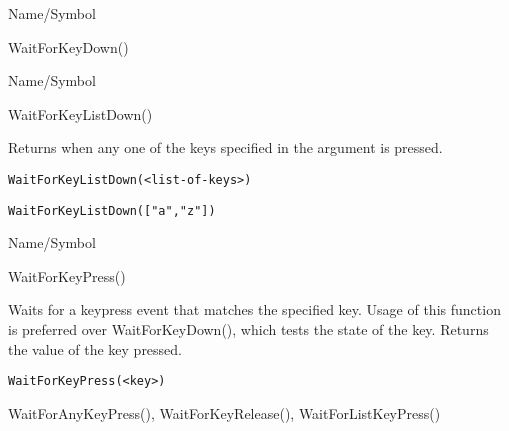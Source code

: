 \rl


\begin{desc}{Name/Symbol}
\item[Name/Symbol]  	WaitForKeyDown()

\item[Description]	

\item[Usage]		

\item[Example]	

\item[See Also]	
\end{desc}

\rl


\begin{desc}{Name/Symbol}
\item[Name/Symbol]  	WaitForKeyListDown()

\item[Description]  	Returns when any one of the keys specified in the argument is 
		pressed.

\item[Usage]
\begin{verbatim}
WaitForKeyListDown(<list-of-keys>)
\end{verbatim}

\item[Example]     	
\begin{verbatim}
WaitForKeyListDown(["a","z"])
\end{verbatim}

\item[See Also]	
 \end{desc}

\rl


\begin{desc}{Name/Symbol}
\item[Name/Symbol]  	WaitForKeyPress()

\item[Description]  	Waits for a keypress event that matches the specified key. 
			Usage of this function is preferred over WaitForKeyDown(), 
			which tests the state of the key. Returns the value of the key 
			pressed.	      

\item[Usage]
\begin{verbatim}
WaitForKeyPress(<key>)
\end{verbatim}

\item[Example]	

\item[See Also]     	WaitForAnyKeyPress(), WaitForKeyRelease(), WaitForListKeyPress()
\end{desc}

